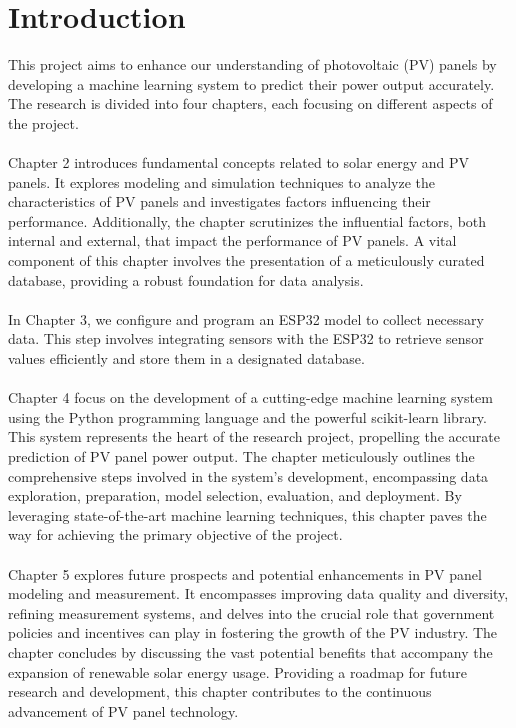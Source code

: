 \documentclass{report}
\begin{document}
\chapter{Introduction}
This project aims to enhance our understanding of photovoltaic (PV) panels by developing a machine learning system to predict their power output accurately. The research is divided into four chapters, each focusing on different aspects of the project.\\
\\
Chapter 2 introduces fundamental concepts related to solar energy and PV panels. It explores modeling and simulation techniques to analyze the characteristics of PV panels and investigates factors influencing their performance. Additionally, the chapter scrutinizes the influential factors, both internal and external, that impact the performance of PV panels. A vital component of this chapter involves the presentation of a meticulously curated database, providing a robust foundation for data analysis.\\
\\
In Chapter 3, we configure and program an ESP32 model to collect necessary data. This step involves integrating sensors with the ESP32 to retrieve sensor values efficiently and store them in a designated database.\\
\\
Chapter 4 focus on the development of a cutting-edge machine learning system using the Python programming language and the powerful scikit-learn library. This system represents the heart of the research project, propelling the accurate prediction of PV panel power output. The chapter meticulously outlines the comprehensive steps involved in the system's development, encompassing data exploration, preparation, model selection, evaluation, and deployment. By leveraging state-of-the-art machine learning techniques, this chapter paves the way for achieving the primary objective of the project.\\
\\
Chapter 5 explores future prospects and potential enhancements in PV panel modeling and measurement. It encompasses improving data quality and diversity, refining measurement systems, and delves into the crucial role that government policies and incentives can play in fostering the growth of the PV industry. The chapter concludes by discussing the vast potential benefits that accompany the expansion of renewable solar energy usage. Providing a roadmap for future research and development, this chapter contributes to the continuous advancement of PV panel technology.\\
\end{document}
